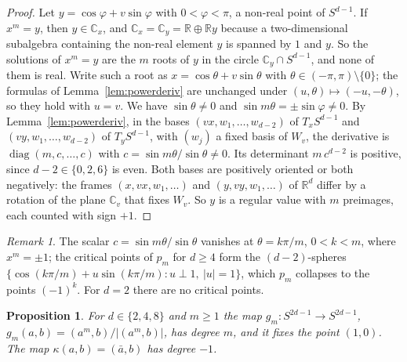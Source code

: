 \documentclass[11pt]{amsart}
\numberwithin{equation}{section}
\theoremstyle{plain}
\newtheorem{proposition}[theorem]{Proposition}
\theoremstyle{definition}
\theoremstyle{remark}
\newtheorem{remark}[theorem]{Remark}
\newcommand{\R}{\mathbb{R}}
\newcommand{\C}{\mathbb{C}}
\begin{document}
\begin{proof}
Let $y=\cos\varphi+v\sin\varphi$ with $0<\varphi<\pi$, a non-real point of $S^{d-1}$. If $x^m=y$, then $y\in\C_x$, and $\C_x=\C_y=\R\oplus\R y$ because a two-dimensional subalgebra containing the non-real element $y$ is spanned by $1$ and $y$. So the solutions of $x^m=y$ are the $m$ roots of $y$ in the circle $\C_y\cap S^{d-1}$, and none of them is real. Write such a root as $x=\cos\theta+v\sin\theta$ with $\theta\in(-\pi,\pi)\setminus\{0\}$; the formulas of Lemma~\ref{lem:powerderiv} are unchanged under $(u,\theta)\mapsto(-u,-\theta)$, so they hold with $u=v$. We have $\sin\theta\ne0$ and $\sin m\theta=\pm\sin\varphi\ne0$. By Lemma~\ref{lem:powerderiv}, in the bases $(vx,w_1,\dots,w_{d-2})$ of $T_xS^{d-1}$ and $(vy,w_1,\dots,w_{d-2})$ of $T_yS^{d-1}$, with $(w_j)$ a fixed basis of $W_v$, the derivative is $\operatorname{diag}(m,c,\dots,c)$ with $c=\sin m\theta/\sin\theta\ne0$. Its determinant $m\,c^{d-2}$ is positive, since $d-2\in\{0,2,6\}$ is even. Both bases are positively oriented or both negatively: the frames $(x,vx,w_1,\dots)$ and $(y,vy,w_1,\dots)$ of $\R^d$ differ by a rotation of the plane $\C_v$ that fixes $W_v$. So $y$ is a regular value with $m$ preimages, each counted with sign $+1$.
\end{proof}

\begin{remark}
The scalar $c=\sin m\theta/\sin\theta$ vanishes at $\theta=k\pi/m$, $0<k<m$, where $x^m=\pm1$; the critical points of $p_m$ for $d\ge4$ form the $(d-2)$-spheres $\{\cos(k\pi/m)+u\sin(k\pi/m):u\perp1,\ |u|=1\}$, which $p_m$ collapses to the points $(-1)^k$. For $d=2$ there are no critical points.
\end{remark}

\begin{proposition}\label{prop:gm}
For $d\in\{2,4,8\}$ and $m\ge1$ the map $g_m\colon S^{2d-1}\to S^{2d-1}$, $g_m(a,b)=(a^m,b)/|(a^m,b)|$, has degree $m$, and it fixes the point $(1,0)$. The map $\kappa(a,b)=(\bar a,b)$ has degree $-1$.
\end{proposition}
\end{document}
